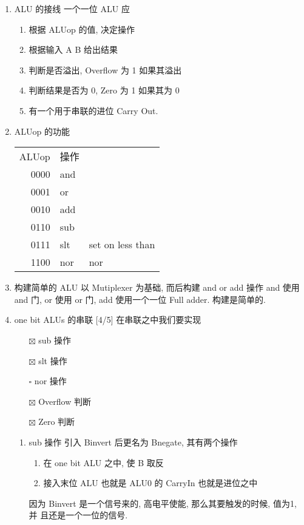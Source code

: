 \documentclass[11pt]{ctexart}
\begin{document}
\begin{enumerate}
\item ALU 的接线
\label{sec:orgf9638ae}
一个一位 ALU 应
\begin{enumerate}
\item 根据 ALUop 的值, 决定操作
\item 根据输入 A B 给出结果
\item 判断是否溢出, Overflow 为 1 如果其溢出
\item 判断结果是否为 0, Zero 为 1 如果其为 0
\item 有一个用于串联的进位 Carry Out.
\end{enumerate}
\item ALUop 的功能
\label{sec:org4b0ff1c}

\begin{center}
\begin{tabular}{rll}
ALUop & 操作 & \\
0000 & and & \\
0001 & or & \\
0010 & add & \\
0110 & sub & \\
0111 & slt & set on less than\\
1100 & nor & nor\\
\end{tabular}
\end{center}

\item 构建简单的 ALU
\label{sec:org438b86c}
以 Mutiplexer 为基础, 而后构建 and or add 操作
and 使用 and 门, or 使用 or 门, add 使用一个一位 Full adder. 
构建是简单的. 

\item one bit ALUs 的串联 [4/5]
\label{sec:org3abd5be}
在串联之中我们要实现
\begin{itemize}
\item[{$\boxtimes$}] sub 操作
\item[{$\boxtimes$}] slt 操作
\item[{$\square$}] nor 操作
\item[{$\boxtimes$}] Overflow 判断
\item[{$\boxtimes$}] Zero 判断
\end{itemize}

\begin{enumerate}
\item sub 操作
\label{sec:org2f4d1d2}
引入 Binvert 后更名为 Bnegate, 其有两个操作
\begin{enumerate}
\item 在 one bit ALU 之中, 使 B 取反
\item 接入末位 ALU 也就是 ALU0 的 CarryIn 也就是进位之中
\end{enumerate}
因为 Binvert 是一个信号来的, 高电平使能, 那么其要触发的时候, 值为1, 并
且还是一个一位的信号. 


\end{enumerate}
\end{enumerate}
\end{document}

